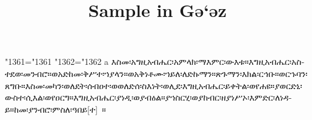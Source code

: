 \documentclass[12pt]{article}
\begin{document}
\title{Sample in Gǝ`ǝz}
\maketitle

\newdimen\savehsize
\savehsize\hsize

\long{}

\begin{amharic}
\lccode"1361="1361
\lccode"1362="1362
\hyphenchar{}
a እስመ፡አግዚአብሔር፡አምላክ፡ማእምር፡ውእቱ።እግዚአብሔር፡አስተደወ፡መንብሮ።ወአድከመ፡ቅሥተ፡ኀያላን።ወአቅነቶሙ፡ኀይለ፡ለድኩማን።ጽጉማን፡እክል፡ርኅቡ።ወርኁባን፡ጸግቡ።እስመ፡መካን፡ወለደት፡ሰብዐተ፡ወወለድሰ፡ስእነት፡ወሊደ፡እግዚአብሔር፡ይቀትል፡ወየሐዩ።ያወርድኒ፡ውስተ፡ሲእል፡ወየዐርግ።እግዚአብሔር፡ያነዲ፡ወያብዕል።ያኀስርሂ፡ወያከብር፡ዘያነሥኦ፡እምድር፡ለነዳይ።ከመ፡ያንብሮ፡ምስለ፡ዓበይ[ተ]~።

\end{amharic}
\end{document}
